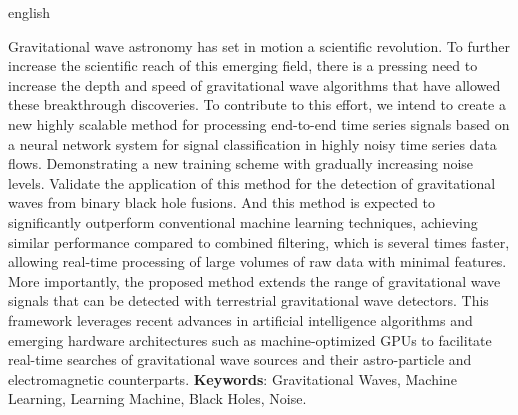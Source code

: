 \begin{resumo}[Abstract]
 \begin{otherlanguage*}{english}
  
Gravitational wave astronomy has set in motion a scientific revolution. To further increase the scientific reach of this emerging field, there is a pressing need to increase the depth and speed of gravitational wave algorithms that have allowed these breakthrough discoveries. To contribute to this effort, we intend to create a new highly scalable method for processing end-to-end time series signals based on a neural network system for signal classification in highly noisy time series data flows. Demonstrating a new training scheme with gradually increasing noise levels. Validate the application of this method for the detection of gravitational waves from binary black hole fusions. And this method is expected to significantly outperform conventional machine learning techniques, achieving similar performance compared to combined filtering, which is several times faster, allowing real-time processing of large volumes of raw data with minimal features. More importantly, the proposed method extends the range of gravitational wave signals that can be detected with terrestrial gravitational wave detectors. This framework leverages recent advances in artificial intelligence algorithms and emerging hardware architectures such as machine-optimized GPUs to facilitate real-time searches of gravitational wave sources and their astro-particle and electromagnetic counterparts.
   \textbf{Keywords}:  Gravitational Waves, Machine Learning, Learning Machine, Black Holes, Noise.
 \end{otherlanguage*}
\end{resumo}